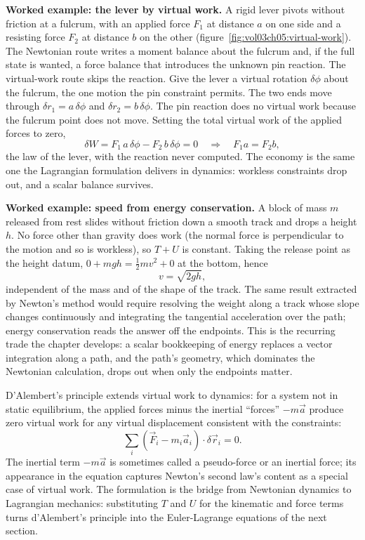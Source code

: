 \textbf{Worked example: the lever by virtual work.} A rigid lever
pivots without friction at a fulcrum, with an applied force $F_1$ at
distance $a$ on one side and a resisting force $F_2$ at distance $b$ on
the other (figure~\ref{fig:vol03ch05:virtual-work}). The Newtonian
route writes a moment balance about the fulcrum and, if the full state
is wanted, a force balance that introduces the unknown pin reaction.
The virtual-work route skips the reaction. Give the lever a virtual
rotation $\delta\phi$ about the fulcrum, the one motion the pin
constraint permits. The two ends move through $\delta r_1 = a\,\delta\phi$
and $\delta r_2 = b\,\delta\phi$. The pin reaction does no virtual work
because the fulcrum point does not move. Setting the total virtual work
of the applied forces to zero,
\[
\delta W = F_1\,a\,\delta\phi - F_2\,b\,\delta\phi = 0
\quad\Longrightarrow\quad
F_1 a = F_2 b,
\]
the law of the lever, with the reaction never computed. The economy is
the same one the Lagrangian formulation delivers in dynamics: workless
constraints drop out, and a scalar balance survives.



\textbf{Worked example: speed from energy conservation.} A block of
mass $m$ released from rest slides without friction down a smooth track
and drops a height $h$. No force other than gravity does work (the
normal force is perpendicular to the motion and so is workless), so
$T + U$ is constant. Taking the release point as the height datum,
$0 + mgh = \tfrac12 m v^2 + 0$ at the bottom, hence
\[
v = \sqrt{2 g h},
\]
independent of the mass and of the shape of the track. The same result
extracted by Newton's method would require resolving the weight along a
track whose slope changes continuously and integrating the tangential
acceleration over the path; energy conservation reads the answer off
the endpoints. This is the recurring trade the chapter develops: a
scalar bookkeeping of energy replaces a vector integration along a
path, and the path's geometry, which dominates the Newtonian
calculation, drops out when only the endpoints matter.

D'Alembert's principle extends virtual work to dynamics: for a system
not in static equilibrium, the applied forces minus the inertial
``forces'' $-m\vec{a}$ produce zero virtual work for any virtual
displacement consistent with the constraints:
\[
\sum_i (\vec{F}_i - m_i \vec{a}_i) \cdot \delta \vec{r}_i = 0.
\]
The inertial term $-m\vec{a}$ is sometimes called a pseudo-force or
an inertial force; its appearance in the equation captures Newton's
second law's content as a special case of virtual work. The
formulation is the bridge from Newtonian dynamics to Lagrangian
mechanics: substituting $T$ and $U$ for the kinematic and force terms
turns d'Alembert's principle into the Euler-Lagrange equations of
the next section.

